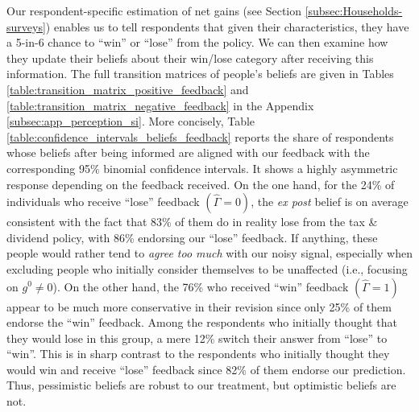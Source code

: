 \documentclass[12pt]{article} %
\begin{document}
Our respondent-specific estimation of net gains (see Section \ref{subsec:Households-surveys}) enables us to tell respondents that given their characteristics, they have a 5-in-6 chance to ``win'' or ``lose'' from the policy. We can then examine how they update their beliefs about their win/lose category after receiving this information. The full transition matrices of people's beliefs are given in Tables \ref{table:transition_matrix_positive_feedback} and \ref{table:transition_matrix_negative_feedback} in the Appendix \ref{subsec:app_perception_si}. More concisely, Table \ref{table:confidence_intervals_beliefs_feedback} reports the share of respondents whose beliefs after being informed are aligned with our feedback with the corresponding 95\% binomial confidence intervals. It shows a highly asymmetric response depending on the feedback received. On the one hand, for the 24\% of individuals who receive ``lose'' feedback $(\widehat{\Gamma} = 0)$, the \textit{ex post} belief is on average consistent with the fact that 83\% of them do in reality lose from the tax \& dividend policy, with 86\% endorsing our ``lose'' feedback. If anything, these people would rather tend to \textit{agree too much} with our noisy signal, especially when excluding people who initially consider themselves to be unaffected (i.e., focusing on $g^0 \neq 0$). On the other hand, the 76\% who received ``win'' feedback $(\widehat{\Gamma} = 1)$ appear to be much more conservative in their revision since only 25\% of them endorse the ``win'' feedback. Among the respondents who initially thought that they would lose in this group, a mere 12\% switch their answer from ``lose'' to ``win''. This is in sharp contrast to the respondents who initially thought they would win and receive ``lose'' feedback since 82\% of them endorse our prediction. Thus, pessimistic beliefs are robust to our treatment, but optimistic beliefs are not.


\end{document}
